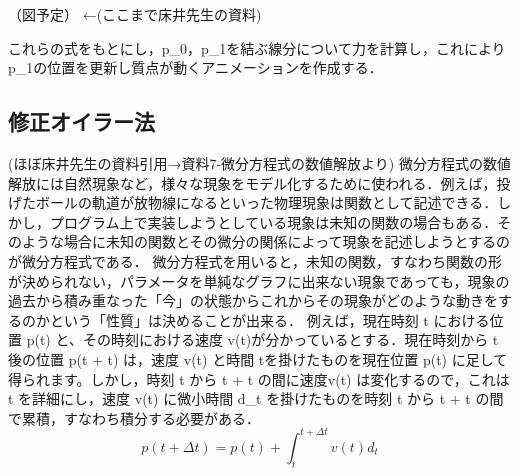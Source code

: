 \documentclass[11pt]{jreport}
\begin{document}
（図予定）
←(ここまで床井先生の資料)

 これらの式をもとにし，p_{0}，p_{1}を結ぶ線分について力を計算し，これによりp_{1}の位置を更新し質点が動くアニメーションを作成する．

%

\subsection{修正オイラー法}
 (ほぼ床井先生の資料引用→資料7-微分方程式の数値解放より)
 微分方程式の数値解放には自然現象など，様々な現象をモデル化するために使われる．例えば，投げたボールの軌道が放物線になるといった物理現象は関数として記述できる．しかし，プログラム上で実装しようとしている現象は未知の関数の場合もある．そのような場合に未知の関数とその微分の関係によって現象を記述しようとするのが微分方程式である．
 微分方程式を用いると，未知の関数，すなわち関数の形が決められない，パラメータを単純なグラフに出来ない現象であっても，現象の過去から積み重なった「今」の状態からこれからその現象がどのような動きをするのかという「性質」は決めることが出来る．
 例えば，現在時刻 t における位置 p(t) と、その時刻における速度 v(t)が分かっているとする．現在時刻から \Delta t 後の位置 p(t + \Delta t) は，速度 v(t) と時間 \Delta tを掛けたものを現在位置 p(t) に足して得られます。しかし，時刻 t から t + \Delta t の間に速度v(t) は変化するので，これは \Delta t を詳細にし，速度 v(t) に微小時間 d_{t} を掛けたものを時刻 t から t + \Delta t の間で累積，すなわち積分する必要がある．
\begin{equation}
  p(t + \Delta t) = p(t) + \int^{t+\Delta t}_{t} v(t)d_{t} \label{exp:sample}
\end{equation}
\end{document}
